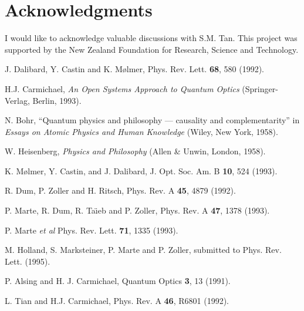 \section*{Acknowledgments}

I would like to acknowledge valuable discussions with S.M. Tan.
This project was supported by the New Zealand Foundation for Research,
Science and Technology.


\begin{thebibliography}{99}


J. Dalibard, Y. Castin and K. M\o lmer,
Phys. Rev. Lett. {\bf 68}, 580 (1992).

H.J. Carmichael,
{\em An Open Systems Approach to Quantum Optics}
(Springer-Verlag, Berlin, 1993).

N. Bohr,
``Quantum physics and philosophy --- causality and complementarity''
in {\em Essays on Atomic Physics and Human Knowledge}
(Wiley, New York, 1958).

W. Heisenberg,
{\em Physics and Philosophy}
(Allen \& Unwin, London, 1958).

K. M\o lmer, Y. Castin, and J. Dalibard,
J. Opt. Soc. Am. B {\bf 10}, 524 (1993).

R. Dum, P. Zoller and H. Ritsch,
Phys. Rev. A {\bf 45}, 4879 (1992).

P. Marte, R. Dum, R. Ta\"{\i}eb and P. Zoller,
Phys. Rev. A {\bf 47}, 1378 (1993).

P. Marte {\em et al}
Phys. Rev. Lett. {\bf 71}, 1335 (1993).

M. Holland, S. Marksteiner, P. Marte and P. Zoller,
submitted to Phys. Rev. Lett. (1995).

P. Alsing and H. J. Carmichael,
Quantum Optics {\bf 3}, 13 (1991).

L. Tian and H.J. Carmichael,
Phys. Rev. A {\bf 46}, R6801 (1992).


\end{thebibliography}
